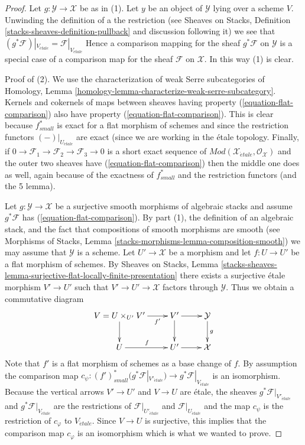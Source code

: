 \begin{proof}
Let $g : \mathcal{Y} \to \mathcal{X}$ be as in (1).
Let $y$ be an object of $\mathcal{Y}$ lying over a scheme $V$. Unwinding
the definition of a the restriction (see
Sheaves on Stacks, Definition \ref{stacks-sheaves-definition-pullback}
and discussion following it) we see that
$(g^*\mathcal{F})|_{V_{\acute{e}tale}} = \mathcal{F}|_{V_{\acute{e}tale}}$
Hence a comparison mapping for the sheaf $g^*\mathcal{F}$ on $\mathcal{Y}$
is a special case of a comparison map for the sheaf $\mathcal{F}$ on
$\mathcal{X}$. In this way (1) is clear.

\medskip\noindent
Proof of (2). We use the characterization of weak Serre subcategories of
Homology, Lemma \ref{homology-lemma-characterize-weak-serre-subcategory}.
Kernels and cokernels of
maps between sheaves having property (\ref{equation-flat-comparison})
also have property (\ref{equation-flat-comparison}). This is clear because
$f_{small}^*$ is exact for a flat morphism of schemes and since the restriction
functors $(-)|_{U_{\acute{e}tale}}$ are exact (since we are working in
the \'etale topology. Finally, if $0 \to \mathcal{F}_1 \to \mathcal{F}_2
\to \mathcal{F}_3 \to 0$ is a short exact sequence of
$\textit{Mod}(\mathcal{X}_{\acute{e}tale}, \mathcal{O}_\mathcal{X})$
and the outer two sheaves have (\ref{equation-flat-comparison}) then
the middle one does as well, again because of the exactness of
$f_{small}^*$ and the restriction functors (and the 5 lemma).

\medskip\noindent
Let $g : \mathcal{Y} \to \mathcal{X}$ be a surjective smooth
morphisms of algebraic stacks and assume $g^*\mathcal{F}$
has (\ref{equation-flat-comparison}). By part (1), the definition of
an algebraic stack, and the fact that compositions of smooth morphisms
are smooth (see
Morphisms of Stacks, Lemma \ref{stacks-morphisms-lemma-composition-smooth})
we may assume that $\mathcal{Y}$ is a scheme. Let $U' \to \mathcal{X}$
be a morphism and let $f : U \to U'$ be a flat morphism of schemes.
By Sheaves on Stacks, Lemma
\ref{stacks-sheaves-lemma-surjective-flat-locally-finite-presentation}
there exists a surjective \'etale morphism $V' \to U'$ such that
$V' \to U' \to \mathcal{X}$ factors through $\mathcal{Y}$.
Thus we obtain a commutative diagram
$$
\xymatrix{
V = U \times_{U'} V' \ar[r]_-{f'} \ar[d] &
V' \ar[r] \ar[d] & \mathcal{Y} \ar[d]^g \\
U \ar[r]^f & U' \ar[r] & \mathcal{X}
}
$$
Note that $f'$ is a flat morphism of schemes as a base change of $f$.
By assumption the comparison map
$c_\psi : (f')_{small}^*\big(g^*\mathcal{F}|_{V'_{\acute{e}tale}}\big)
\to g^*\mathcal{F}|_{V_{\acute{e}tale}}$ is an isomorphism.
Because the vertical arrows $V' \to U'$ and $V \to U$ are \'etale,
the sheaves $g^*\mathcal{F}|_{V'_{\acute{e}tale}}$ and
$g^*\mathcal{F}|_{V_{\acute{e}tale}}$ are the restrictions of
$\mathcal{F}|_{U'_{\acute{e}tale}}$ and $\mathcal{F}|_{U_{\acute{e}tale}}$
and the map $c_\psi$ is the restriction of $c_\varphi$ to
$V_{\acute{e}tale}$. Since $V \to U$ is surjective, this implies
that the comparison map $c_\varphi$ is an isomorphism which is what
we wanted to prove.
\end{proof}

